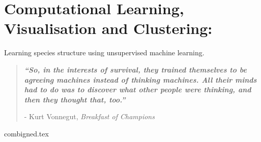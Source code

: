 

\chapter{ Computational Learning, Visualisation and Clustering:}
\vspace{-1cm} {\Large Learning species structure using unsupervised machine learning. } 


\blankpage
\restoregeometry
\vspace*{0.15\paperheight}


\begin{center}
\begin{quotation}
  \large{\emph{\textbf{``So, in the interests of survival, they trained themselves to be agreeing machines instead of thinking machines. All their minds had to do was to discover what other people were thinking, and then they thought that, too.''} }  }  \\
  \begin{flushright}
  - Kurt Vonnegut, \textit{Breakfast of Champions} 
  \end{flushright}
 \end{quotation}
\end{center}
\doublespacing
\newpage

%





{combigned.tex} 

\chapterbib






